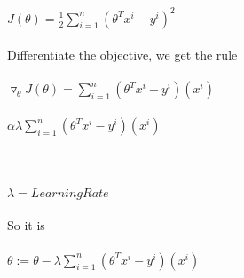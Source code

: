 \newcommand\tab[1][1cm]{\hspace*{#1}}
\begin{answer}
\\ \\
\tab[2.25cm] $J(\theta) = \frac{1}{2} \sum^n_{i=1}(\theta^Tx^i-y^i)^2$ \\ \\
Differentiate the objective, we get the rule\\ \\ 
\tab[2.25cm] $\triangledown_\theta J(\theta) = \sum^n_{i=1}(\theta^Tx^i-y^i)(x^i)$\\ \\
\tab[3.25cm] $\alpha \lambda \sum^n_{i=1}(\theta^Tx^i-y^i)(x^i)$ \\ \\ \\ \\
$\lambda = Learning Rate $ \\ \\
So it is  \\ \\
\tab[2.25cm]$ \theta := \theta - \lambda \sum^n_{i=1}(\theta^Tx^i-y^i)(x^i)$ \\ \\
\end{answer}
